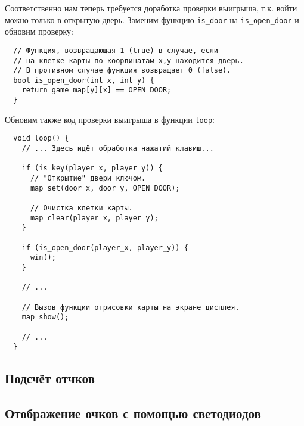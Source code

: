 \documentclass[../sparc.tex]{subfiles}
\begin{document}
Соответственно нам теперь требуется доработка проверки выигрыша, т.к. войти
можно только в открытую дверь.  Заменим функцию \texttt{is\_door} на
\texttt{is\_open\_door} и обновим проверку:

\begin{verbatim}
  // Функция, возвращающая 1 (true) в случае, если
  // на клетке карты по координатам x,y находится дверь.
  // В противном случае функция возвращает 0 (false).
  bool is_open_door(int x, int y) {
    return game_map[y][x] == OPEN_DOOR;
  }
\end{verbatim}

Обновим также код проверки выигрыша в функции \texttt{loop}:

\begin{verbatim}
  void loop() {
    // ... Здесь идёт обработка нажатий клавиш...

    if (is_key(player_x, player_y)) {
      // "Открытие" двери ключом.
      map_set(door_x, door_y, OPEN_DOOR);

      // Очистка клетки карты.
      map_clear(player_x, player_y);
    }

    if (is_open_door(player_x, player_y)) {
      win();
    }

    // ...

    // Вызов функции отрисовки карты на экране дисплея.
    map_show();

    // ...
  }
\end{verbatim}

\subsection{Подсчёт отчков}

\subsection{Отображение очков с помощью светодиодов}
\end{document}
